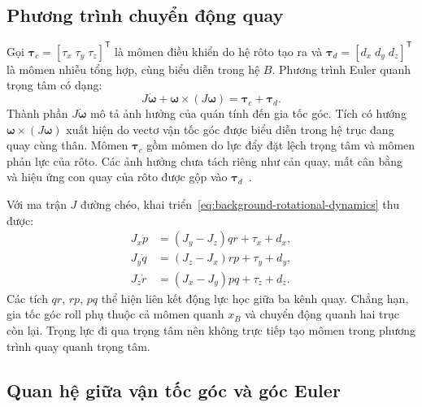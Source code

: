 \subsection{Phương trình chuyển động quay}

Gọi $\symbf{\tau}_c=[\tau_x\;\tau_y\;\tau_z]^{\mathsf T}$ là mômen điều khiển do hệ rôto tạo ra và $\symbf{\tau}_d=[d_x\;d_y\;d_z]^{\mathsf T}$ là mômen nhiễu tổng hợp, cùng biểu diễn trong hệ $B$. Phương trình Euler quanh trọng tâm có dạng:
\begin{equation}
	J\dot{\symbf{\omega}}
	+\symbf{\omega}\times(J\symbf{\omega})
	=\symbf{\tau}_c+\symbf{\tau}_d.
	\label{eq:background-rotational-dynamics}
\end{equation}
Thành phần $J\dot{\symbf{\omega}}$ mô tả ảnh hưởng của quán tính đến gia tốc góc. Tích có hướng $\symbf{\omega}\times(J\symbf{\omega})$ xuất hiện do vectơ vận tốc góc được biểu diễn trong hệ trục đang quay cùng thân. Mômen $\symbf{\tau}_c$ gồm mômen do lực đẩy đặt lệch trọng tâm và mômen phản lực của rôto. Các ảnh hưởng chưa tách riêng như cản quay, mất cân bằng và hiệu ứng con quay của rôto được gộp vào $\symbf{\tau}_d$~\cite{bouabdallah2004design,chovancova2014mathematical}.

Với ma trận $J$ đường chéo, khai triển~\eqref{eq:background-rotational-dynamics} thu được:
\begin{equation}
	\begin{aligned}
		J_x\dot p & =(J_y-J_z)qr+\tau_x+d_x, \\
		J_y\dot q & =(J_z-J_x)rp+\tau_y+d_y, \\
		J_z\dot r & =(J_x-J_y)pq+\tau_z+d_z.
	\end{aligned}
	\label{eq:background-angular-dynamics-components}
\end{equation}
Các tích $qr$, $rp$, $pq$ thể hiện liên kết động lực học giữa ba kênh quay. Chẳng hạn, gia tốc góc roll phụ thuộc cả mômen quanh $x_B$ và chuyển động quanh hai trục còn lại. Trọng lực đi qua trọng tâm nên không trực tiếp tạo mômen trong phương trình quay quanh trọng tâm.

\subsection{Quan hệ giữa vận tốc góc và góc Euler}

